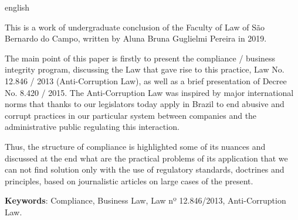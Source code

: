 \setlength{\absparsep}{18pt} %
\begin{resumo}[Abstract]
 \begin{otherlanguage*}{english}

  
  This is a work of undergraduate conclusion of the Faculty of Law of São Bernardo do Campo, written by Aluna Bruna Guglielmi Pereira in 2019.

The main point of this paper is firstly to present the compliance / business integrity program, discussing the Law that gave rise to this practice, Law No. 12.846 / 2013 (Anti-Corruption Law), as well as a brief presentation of Decree No. 8.420 / 2015. The Anti-Corruption Law was inspired by major international norms that thanks to our legislators today apply in Brazil to end abusive and corrupt practices in our particular system between companies and the administrative public regulating this interaction.

Thus, the structure of compliance is highlighted some of its nuances and discussed at the end what are the practical problems of its application that we can not find solution only with the use of regulatory standards, doctrines and principles, based on journalistic articles on large cases of the present.


   \vspace{\onelineskip}
 
   \noindent 
   \textbf{Keywords}:
   Compliance, Business Law, Law nº 12.846/2013, Anti-Corruption Law.
 \end{otherlanguage*}
\end{resumo}
